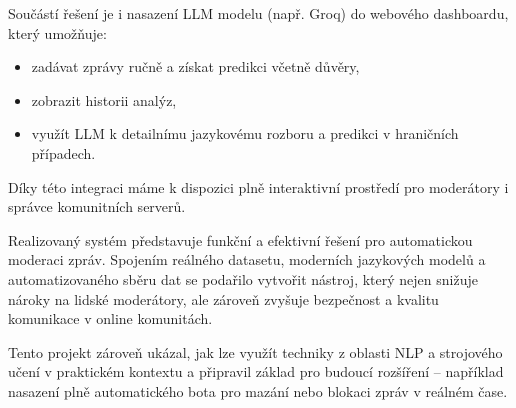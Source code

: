 \documentclass[FM,Proj]{tulthesis}
\begin{document}
Součástí řešení je i nasazení LLM modelu (např. Groq) do webového dashboardu, který umožňuje:

\begin{itemize}
    \item zadávat zprávy ručně a získat predikci včetně důvěry,
    \item zobrazit historii analýz,
    \item využít LLM k detailnímu jazykovému rozboru a predikci v hraničních případech.
\end{itemize}
Díky této integraci máme k dispozici plně interaktivní prostředí pro moderátory i správce komunitních serverů.

Realizovaný systém představuje funkční a efektivní řešení pro automatickou moderaci zpráv. Spojením reálného datasetu, moderních jazykových modelů a automatizovaného sběru dat se podařilo vytvořit nástroj, který nejen snižuje nároky na lidské moderátory, ale zároveň zvyšuje bezpečnost a kvalitu komunikace v online komunitách.

Tento projekt zároveň ukázal, jak lze využít techniky z oblasti NLP a strojového učení v praktickém kontextu a připravil základ pro budoucí rozšíření – například nasazení plně automatického bota pro mazání nebo blokaci zpráv v reálném čase.

\printbibliography[title={Použitá literatura}, heading=bibintoc]
\end{document}
